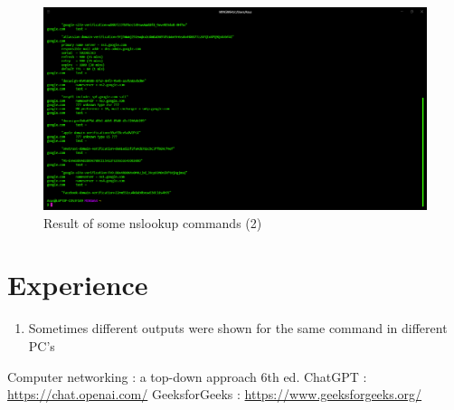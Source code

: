 \documentclass[11pt]{article}
\begin{document}
\begin{figure}
    \centering
    \includegraphics[width=\textwidth]{nslookup 2.png}
    \caption{Result of some nslookup commands (2)}  
\end{figure}

\newpage
\section{Experience}
\begin{enumerate}
\item Sometimes different outputs were shown for the same command in different PC's
\end{enumerate}

\begin{thebibliography}{1}
  Computer networking : a top-down approach 6th ed.
 ChatGPT : \url{https://chat.openai.com/}
 GeeksforGeeks : \url{https://www.geeksforgeeks.org/}
\end{thebibliography}
\end{document}
